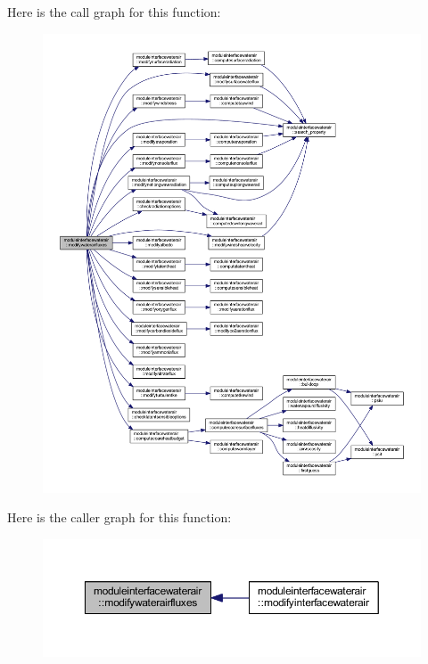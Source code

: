 Here is the call graph for this function\+:\nopagebreak
\begin{figure}[H]
\begin{center}
\leavevmode
\includegraphics[width=350pt]{namespacemoduleinterfacewaterair_a91edae849454c0ec7ebcefd91556486e_cgraph}
\end{center}
\end{figure}
Here is the caller graph for this function\+:\nopagebreak
\begin{figure}[H]
\begin{center}
\leavevmode
\includegraphics[width=350pt]{namespacemoduleinterfacewaterair_a91edae849454c0ec7ebcefd91556486e_icgraph}
\end{center}
\end{figure}
\mbox{\label{namespacemoduleinterfacewaterair_a2494cba9b6646ce732323f31ef820a97}} 
